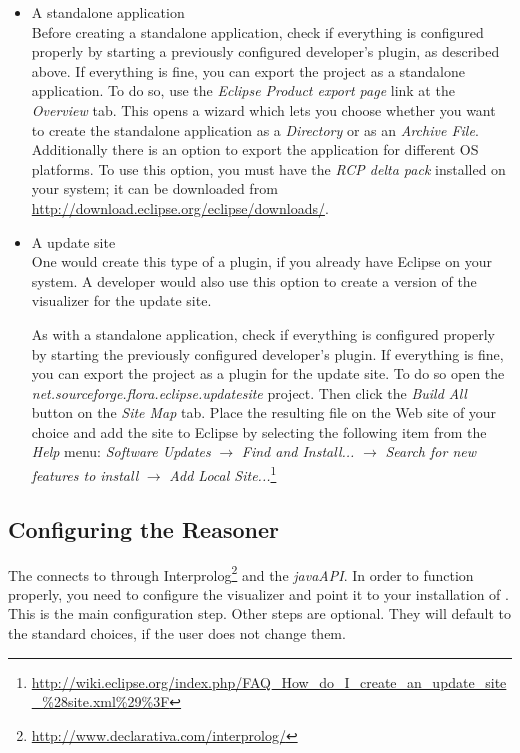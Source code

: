 \begin{enumerate}
\begin{itemize}
\item A standalone application\\
  Before creating a standalone application, check if everything is
  configured properly by starting a previously configured developer's
  plugin, as described above.  If everything is fine, you can export the
  project as a standalone application.  To do so, use the \emph{Eclipse
    Product export page} link at the \emph{Overview} tab.  This opens a
  wizard which lets you choose whether you want to create the standalone
  application as a
  \emph{Directory} or as an \emph{Archive File}.\\
  Additionally there is an option to export the application for different
  OS platforms.  To use this option, you must have the \emph{RCP delta
    pack} installed on your system; it can be downloaded from
  \url{http://download.eclipse.org/eclipse/downloads/}.

\item A update site\\
  One would create this type of a plugin, if you already have Eclipse on
  your system. A developer would also use this option to create a version
  of the visualizer for the update site.

  As with a standalone application, check if everything is configured
  properly by starting the previously configured developer's plugin.
  If everything is fine, you can export the project as a plugin for the update
  site. To do so open the \emph{net.sourceforge.flora.eclipse.updatesite}
  project. Then click the \emph{Build All} button on the \emph{Site Map}
  tab. Place the resulting file on the Web site of your choice and add the
  site to Eclipse by selecting the following item from the \emph{Help}
  menu: \emph{Software Updates} $\rightarrow$
  \emph{Find and Install...}  $\rightarrow$ \emph{Search for new features
    to install} $\rightarrow$ \emph{Add Local Site...}\footnote{
    \url{http://wiki.eclipse.org/index.php/FAQ\_How\_do\_I\_create\_an\_update\_site\_\%28site.xml\%29\%3F}
  }

\end{itemize}


\end{enumerate}

\subsection{Configuring the \FVIZ Reasoner}
\label{sec:reasoner}

The \FVIZ connects to \FLORA through
Interprolog\footnote{\url{http://www.declarativa.com/interprolog/}} and the
\FLORA \emph{javaAPI}. In order to function properly, you need to configure
the visualizer and point it to your installation of \FLORA. This is the
main configuration step. Other steps are optional. They will default to the
standard choices, if the user does not change them.


